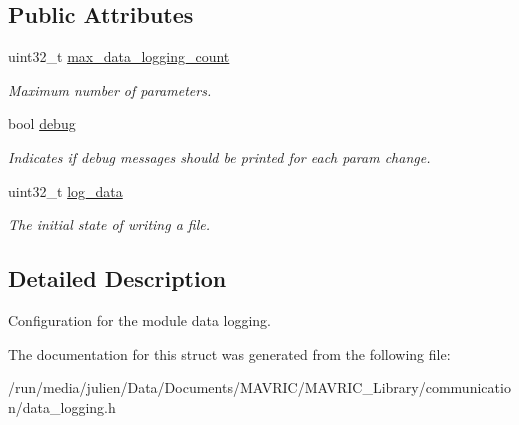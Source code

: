 \subsection*{Public Attributes}
\begin{DoxyCompactItemize}
\item 
\hypertarget{structdata__logging__conf__t_a03ed2a95586585cd1d06fd24159126c3}{uint32\+\_\+t \hyperlink{structdata__logging__conf__t_a03ed2a95586585cd1d06fd24159126c3}{max\+\_\+data\+\_\+logging\+\_\+count}}\label{structdata__logging__conf__t_a03ed2a95586585cd1d06fd24159126c3}

\begin{DoxyCompactList}\small\item\em Maximum number of parameters. \end{DoxyCompactList}\item 
\hypertarget{structdata__logging__conf__t_adabb45e91cc3bdc349195914ea4efd5b}{bool \hyperlink{structdata__logging__conf__t_adabb45e91cc3bdc349195914ea4efd5b}{debug}}\label{structdata__logging__conf__t_adabb45e91cc3bdc349195914ea4efd5b}

\begin{DoxyCompactList}\small\item\em Indicates if debug messages should be printed for each param change. \end{DoxyCompactList}\item 
\hypertarget{structdata__logging__conf__t_ade06ebd3d21bff7536c26cef05a601fa}{uint32\+\_\+t \hyperlink{structdata__logging__conf__t_ade06ebd3d21bff7536c26cef05a601fa}{log\+\_\+data}}\label{structdata__logging__conf__t_ade06ebd3d21bff7536c26cef05a601fa}

\begin{DoxyCompactList}\small\item\em The initial state of writing a file. \end{DoxyCompactList}\end{DoxyCompactItemize}


\subsection{Detailed Description}
Configuration for the module data logging. 

The documentation for this struct was generated from the following file\+:\begin{DoxyCompactItemize}
\item 
/run/media/julien/\+Data/\+Documents/\+M\+A\+V\+R\+I\+C/\+M\+A\+V\+R\+I\+C\+\_\+\+Library/communication/data\+\_\+logging.\+h\end{DoxyCompactItemize}
